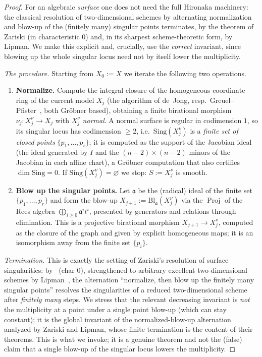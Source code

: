\documentclass{amsart}
\theoremstyle{plain}
\theoremstyle{definition}
\DeclareMathOperator{\Proj}{Proj}
\begin{document}
\begin{proof}
For an algebraic \emph{surface} one does not need the full Hironaka machinery:
the classical resolution of two-dimensional schemes by alternating
normalization and blow-up of the (finitely many) singular points terminates,
by the theorem of Zariski (in characteristic $0$) and, in its sharpest
scheme-theoretic form, by Lipman.  We make this explicit and, crucially, use the
\emph{correct} invariant, since blowing up the whole singular locus need not by
itself lower the multiplicity.

\smallskip\noindent\emph{The procedure.}  Starting from $X_0:=X$ we iterate the
following two operations.
\begin{enumerate}
\item \textbf{Normalize.}  Compute the integral closure of the homogeneous
coordinate ring of the current model $X_j$ (the algorithm of de~Jong, resp.\
Greuel--Pfister~\cite{GP}, both Gr\"obner based), obtaining a finite birational
morphism $\nu_j\colon X_j^{\nu}\to X_j$ with $X_j^{\nu}$ \emph{normal}.  A
normal surface is regular in codimension $1$, so its singular locus has
codimension $\ge2$, i.e.\ $\mathrm{Sing}(X_j^{\nu})$ is a \emph{finite set of
closed points} $\{p_1,\dots,p_r\}$; it is computed as the support of the
Jacobian ideal (the ideal generated by $I$ and the $(n-2)\times(n-2)$ minors of
the Jacobian in each affine chart), a Gr\"obner computation that also certifies
$\dim\mathrm{Sing}=0$.  If $\mathrm{Sing}(X_j^{\nu})=\varnothing$ we stop:
$S:=X_j^{\nu}$ is smooth.
\item \textbf{Blow up the singular points.}  Let $\mathfrak a$ be the
(radical) ideal of the finite set $\{p_1,\dots,p_r\}$ and form the blow-up
$X_{j+1}:=\mathrm{Bl}_{\mathfrak a}(X_j^{\nu})$ via the $\Proj$ of the Rees
algebra $\bigoplus_{i\ge0}\mathfrak a^i t^i$, presented by generators and
relations through elimination.  This is a projective birational morphism
$X_{j+1}\to X_j^{\nu}$, computed as the closure of the graph and given by
explicit homogeneous maps; it is an isomorphism away from the finite set
$\{p_i\}$.
\end{enumerate}

\smallskip\noindent\emph{Termination.}  This is exactly the setting of Zariski's
resolution of surface singularities: by~\cite[Thm., \S I]{Zariski} (char $0$),
strengthened to arbitrary excellent two-dimensional schemes by
Lipman~\cite[Main Thm.]{Lipman}, the alternation ``normalize, then blow up the
finitely many singular points'' resolves the singularities of a reduced
two-dimensional scheme after \emph{finitely many} steps.  We stress that the
relevant decreasing invariant is \emph{not} the multiplicity at a point under a
single point blow-up (which can stay constant); it is the global invariant of
the normalized-blow-up alternation analyzed by Zariski and Lipman, whose finite
termination is the content of their theorems.  This is what we invoke; it is a
genuine theorem and not the (false) claim that a single blow-up of the singular
locus lowers the multiplicity.


\end{proof}
\end{document}
